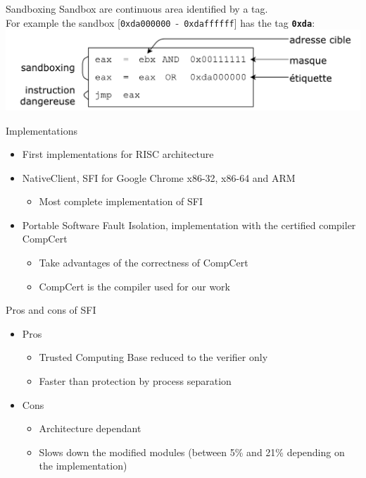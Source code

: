 \documentclass{beamer}
\begin{document}
\begin{frame}{Sandboxing}
	Sandbox are continuous area identified by a tag. \\
	For example the sandbox [\texttt{0xda000000}~-~\texttt{0xdaffffff}] has the tag \textbf{\texttt{0xda}}:
	\hfill \break
	\includegraphics[scale=0.5]{images/algo_sandboxing.pdf}
\end{frame}

\begin{frame}[c]{Implementations}
	\begin{itemize}
		\item First implementations for RISC architecture
		\item NativeClient, SFI for Google Chrome x86-32, x86-64 and ARM
			\begin{itemize}
				\item Most complete implementation of SFI
			\end{itemize}
		\item Portable Software Fault Isolation, implementation with the certified compiler CompCert
			\begin{itemize}
				\item Take advantages of the correctness of CompCert
				\item CompCert is the compiler used for our work
			\end{itemize}
	\end{itemize}
\end{frame}

\begin{frame}{Pros and cons of SFI}
	\begin{itemize}
		\item Pros
		\begin{itemize}
			\item Trusted Computing Base reduced to the verifier only
			\item Faster than protection by process separation
		\end{itemize}
		\item Cons
			\begin{itemize}
				\item Architecture dependant
				\item Slows down the modified modules (between 5\% and 21\% depending on the implementation)
			\end{itemize}
	\end{itemize}
\end{frame}
\end{document}
